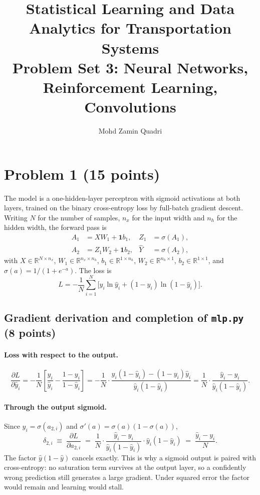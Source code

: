 \documentclass[11pt,a4paper]{article}
\title{\vspace{-1.5cm}Statistical Learning and Data Analytics for Transportation
Systems\\[0.3em]\large Problem Set 3: Neural Networks, Reinforcement Learning,
Convolutions}
\author{Mohd Zamin Quadri}
\date{}
\newcommand{\code}[1]{\texttt{#1}}
\begin{document}
\maketitle

\section{Problem 1 (15 points)}

The model is a one-hidden-layer perceptron with sigmoid activations at both layers,
trained on the binary cross-entropy loss by full-batch gradient descent. Writing $N$
for the number of samples, $n_x$ for the input width and $n_h$ for the hidden width,
the forward pass is
\begin{align}
A_1 &= XW_1 + \mathbf{1}b_1, & Z_1 &= \sigma(A_1), \\
A_2 &= Z_1W_2 + \mathbf{1}b_2, & \hat{Y} &= \sigma(A_2),
\end{align}
with $X\in\mathbb{R}^{N\times n_x}$, $W_1\in\mathbb{R}^{n_x\times n_h}$,
$b_1\in\mathbb{R}^{1\times n_h}$, $W_2\in\mathbb{R}^{n_h\times 1}$,
$b_2\in\mathbb{R}^{1\times 1}$, and $\sigma(a)=1/(1+e^{-a})$. The loss is
\begin{equation}
L = -\frac{1}{N}\sum_{i=1}^{N}
\Big[y_i\ln\hat y_i + (1-y_i)\ln(1-\hat y_i)\Big].
\end{equation}

\subsection{Gradient derivation and completion of \code{mlp.py} (8 points)}

\paragraph{Loss with respect to the output.}
\begin{equation}
\frac{\partial L}{\partial \hat y_i}
= -\frac{1}{N}\left[\frac{y_i}{\hat y_i}-\frac{1-y_i}{1-\hat y_i}\right]
= -\frac{1}{N}\cdot
  \frac{y_i(1-\hat y_i)-(1-y_i)\hat y_i}{\hat y_i(1-\hat y_i)}
= \frac{1}{N}\cdot\frac{\hat y_i-y_i}{\hat y_i(1-\hat y_i)} .
\end{equation}

\paragraph{Through the output sigmoid.} Since $\hat y_i=\sigma(a_{2,i})$ and
$\sigma'(a)=\sigma(a)(1-\sigma(a))$,
\begin{equation}
\delta_{2,i} \;\equiv\; \frac{\partial L}{\partial a_{2,i}}
\;=\; \frac{1}{N}\cdot\frac{\hat y_i-y_i}{\hat y_i(1-\hat y_i)}
      \cdot \hat y_i(1-\hat y_i)
\;=\; \frac{\hat y_i - y_i}{N} .
\label{eq:delta2}
\end{equation}
The factor $\hat y(1-\hat y)$ cancels exactly. This is why a sigmoid output is paired
with cross-entropy: no saturation term survives at the output layer, so a confidently
wrong prediction still generates a large gradient. Under squared error the factor
would remain and learning would stall.
\end{document}
